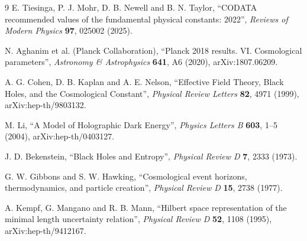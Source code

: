 \documentclass[11pt,a4paper]{article}
\begin{document}
\begin{thebibliography}{9}
E. Tiesinga, P. J. Mohr, D. B. Newell and B. N. Taylor,
``CODATA recommended values of the fundamental physical constants: 2022'',
\emph{Reviews of Modern Physics} \textbf{97}, 025002 (2025).

N. Aghanim et al. (Planck Collaboration),
``Planck 2018 results. VI. Cosmological parameters'',
\emph{Astronomy \& Astrophysics} \textbf{641}, A6 (2020),
arXiv:1807.06209.

A. G. Cohen, D. B. Kaplan and A. E. Nelson,
``Effective Field Theory, Black Holes, and the Cosmological Constant'',
\emph{Physical Review Letters} \textbf{82}, 4971 (1999),
arXiv:hep-th/9803132.

M. Li,
``A Model of Holographic Dark Energy'',
\emph{Physics Letters B} \textbf{603}, 1--5 (2004),
arXiv:hep-th/0403127.

J. D. Bekenstein,
``Black Holes and Entropy'',
\emph{Physical Review D} \textbf{7}, 2333 (1973).

G. W. Gibbons and S. W. Hawking,
``Cosmological event horizons, thermodynamics, and particle creation'',
\emph{Physical Review D} \textbf{15}, 2738 (1977).

A. Kempf, G. Mangano and R. B. Mann,
``Hilbert space representation of the minimal length uncertainty relation'',
\emph{Physical Review D} \textbf{52}, 1108 (1995),
arXiv:hep-th/9412167.
\end{thebibliography}
\end{document}
